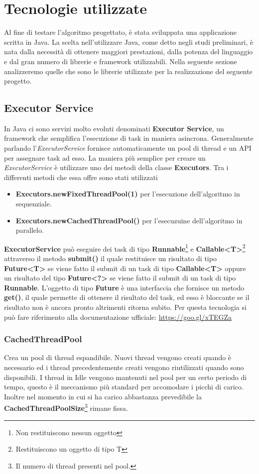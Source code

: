 \section{Tecnologie utilizzate}
Al fine di testare l'algoritmo progettato, è stata sviluppata una applicazione scritta in Java.
La scelta nell'utilizzare Java, come detto negli studi preliminari, è nata dalla necessità di ottenere maggiori prestazioni, dalla potenza del linguaggio e dal gran numero di librerie e framework utilizzabili.
Nella seguente sezione analizzeremo quelle che sono le librerie utilizzate per la realizzazione del seguente progetto.
\subsection{Executor Service}
In Java ci sono servizi molto evoluti denominati \textbf{Executor Service}, un framework che semplifica l'esecuzione di task in maniera asincrona. Generalmente parlando l'\textit{ExecutorService} fornisce automaticamente un pool di thread e un API per assegnare task ad esso.
La maniera più semplice per creare un \textit{ExecutorService} è utilizzare uno dei metodi della classe \textbf{Executors}. Tra i differenti metodi che essa offre sono stati utilizzati
\begin{itemize}
	\item \textbf{Executors.newFixedThreadPool(1)} per l'esecuzione dell'algoritmo in sequenziale.
	\item  \textbf{Executors.newCachedThreadPool()} per l'esecuzuine dell'algoritmo in parallelo.
\end{itemize}
\textbf{ExecutorService} può eseguire dei task di tipo \textbf{Runnable}\footnote{Non restituiscono nessun oggetto} e \textbf{Callable<T>}\footnote{Restituiscono un oggetto di tipo T} attraverso il metodo \textbf{submit()} il quale restituisce un risultato di tipo\\ \textbf{Future<T>} se viene fatto il submit di un task di tipo \textbf{Callable<T>} oppure un risultato del tipo \textbf{Future<?>} se viene fatto il submit di un task di tipo \textbf{Runnable}. L'oggetto di tipo \textbf{Future} è una interfaccia che fornisce un metodo \textbf{get()}, il quale permette di ottenere il risultato del task, ed esso è bloccante se il risultato non è ancora pronto altrimenti ritorna subito.
Per questa tecnologia si può fare riferimento alla documentazione ufficiale: \url{https://goo.gl/xTEGZa}
 
\subsubsection{CachedThreadPool}
Crea un pool di thread espandibile. Nuovi thread vengono creati quando è necessario ed i thread precedentemente creati vengono riutilizzati quando sono disponibili. I thread in Idle vengono mantenuti nel pool per un certo periodo di tempo, questo è il meccanismo più standard per accomodare i picchi di carico. Inoltre nel momento in cui si ha carico abbastanza prevedibile la \textbf{CachedThreadPoolSize}\footnote{Il numero di thread presenti nel pool.} rimane fissa.
